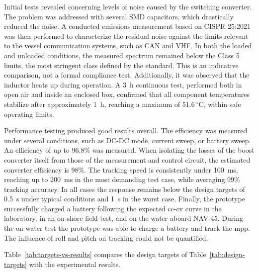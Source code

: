 Initial tests revealed concerning levels of noise caused by the switching converter. The problem was addressed with several SMD capacitors, which drastically reduced the noise. A conducted emissions measurement based on CISPR 25:2021 was then performed to characterize the residual noise against the limits relevant to the vessel communication systems, such as CAN and VHF. In both the loaded and unloaded conditions, the measured spectrum remained below the Class 5 limits, the most stringent class defined by the standard. This is an indicative comparison, not a formal compliance test.
Additionally, it was observed that the inductor heats up during operation. A 3~h continuous test, performed both in open air and inside an enclosed box, confirmed that all component temperatures stabilize after approximately 1~h, reaching a maximum of $51.6~^\circ\mathrm{C}$, within safe operating limits.

Performance testing produced good results overall. The efficiency was measured under several conditions, such as DC-DC mode, current sweep, or battery sweep. An efficiency of up to 96.8\% was measured. When isolating the losses of the boost converter itself from those of the measurement and control circuit, the estimated converter efficiency is 98\%. The tracking speed is consistently under 100~ms, reaching up to 200~ms in the most demanding test case, while averaging 99\% tracking accuracy. In all cases the response remains below the design targets of 0.5~s under typical conditions and 1~s in the worst case.
Finally, the prototype successfully charged a battery following the expected \acs{cc}-\acs{cv} curve in the laboratory, in an on-shore field test, and on the water aboard NAV-45. During the on-water test the prototype was able to charge a battery and track the \ac{mpp}. The influence of roll and pitch on tracking could not be quantified.

Table~\ref{tab:targets-vs-results} compares the design targets of Table~\ref{tab:design-targets} with the experimental results.

